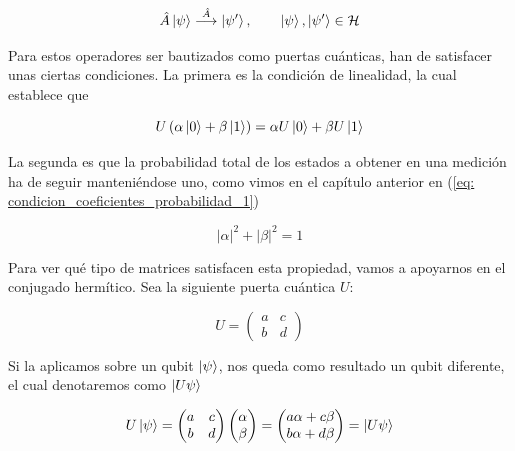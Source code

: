 \documentclass[12pt]{article}
\numberwithin{equation}{section} %
\begin{document}
    \begin{equation*}
        \hat{A} \ket{\psi} \overset{\hat{A}}{\longrightarrow} \ket{\psi '}, \qquad \ket{\psi}, \ket{\psi '} \in \mathcal{H}
    \end{equation*}

    \vspace{2.5mm}

    Para estos operadores ser bautizados como puertas cuánticas, han de satisfacer unas ciertas condiciones. La primera es la condición de linealidad, la cual establece que

    \begin{equation}
        U \left( \alpha \ket{0} + \beta \ket{1} \right) = \alpha U \ket{0} + \beta U \ket{1}
        \label{eq: linealidad_puertas_cuanticas}
    \end{equation}

    \vspace{2.5mm}

    La segunda es que la probabilidad total de los estados a obtener en una medición ha de seguir manteniéndose uno, como vimos en el capítulo anterior en (\ref{eq: condicion_coeficientes_probabilidad_1})

    \begin{equation*}
        | \alpha | ^ {2} + | \beta | ^ {2} = 1
    \end{equation*}

    \vspace{2.5mm}

    Para ver qué tipo de matrices satisfacen esta propiedad, vamos a apoyarnos en el conjugado hermítico. Sea la siguiente puerta cuántica \( U \):

    \begin{equation*}
        U = \begin{pmatrix}
            a & c \\
            b & d
        \end{pmatrix}
    \end{equation*}

    \vspace{2.5mm}

    Si la aplicamos sobre un qubit \( \ket{\psi} \), nos queda como resultado un qubit diferente, el cual denotaremos como \( \ket{U \psi} \)

    \begin{equation}
        U \ket{\psi} = \begin{pmatrix}
            a & c \\
            b & d
        \end{pmatrix} \begin{pmatrix}
            \alpha \\
            \beta
        \end{pmatrix} = \begin{pmatrix}
            a \alpha + c \beta \\
            b \alpha + d \beta
        \end{pmatrix} = \ket{U \psi}
    \label{eq: puerta_cuantica_vector_aplicado}
    \end{equation}
\end{document}
